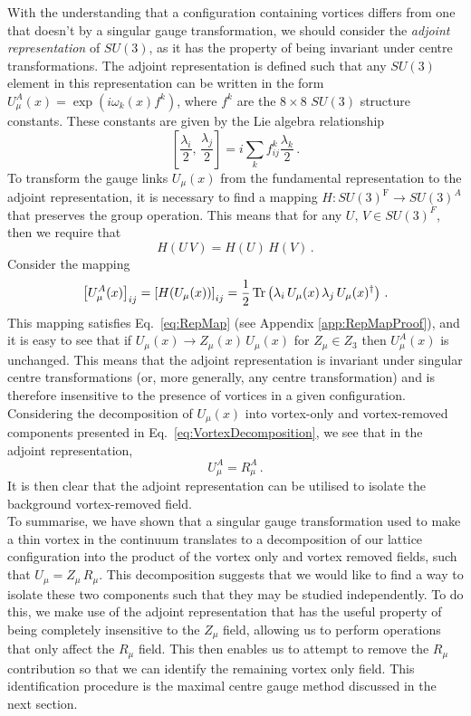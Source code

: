 With the understanding that a configuration containing vortices differs from one that doesn't by a singular gauge transformation, we should consider the \textit{adjoint representation} of $SU(3)$, as it has the property of being invariant under centre transformations. The adjoint representation is defined such that any $SU(3)$ element in this representation can be written in the form $U^A_\mu(x) = \exp\left(i \omega_k(x) f^k\right)$, where $f^k$ are the $8\times 8$ $SU(3)$ structure constants. These constants are given by the Lie algebra relationship
%
\begin{equation}
\left[\frac{\lambda_i}{2},\,\frac{\lambda_j}{2}\right] = i\sum_k f_{ij}^{k}\frac{\lambda_k}{2}\, .
\end{equation}
%
To transform the gauge links $U_\mu(x)$ from the fundamental representation to the adjoint representation, it is necessary to find a mapping $H:SU(3)^\text{F}\rightarrow SU(3)^A$ that preserves the group operation. This means that for any $U,\,V \in SU(3)^F$, then we require that
%
\begin{equation}
H(U\,V) = H(U)\,H(V)\, .
\label{eq:RepMap}
\end{equation}
%
Consider the mapping
%
\begin{equation}
\left[U_\mu^A(x)\right]_{ij} = \left[H(U_\mu(x))\right]_{ij} = \frac{1}{2}\operatorname{Tr}\left(\lambda_i \, U_\mu(x) \, \lambda_j\, U_\mu(x)^\dagger\right)\, .
\label{eq:AdjointRep}
\end{equation}
%
This mapping satisfies Eq.~\ref{eq:RepMap} (see Appendix \ref{app:RepMapProof}), and it is easy to see that if $U_\mu(x)\rightarrow Z_\mu(x)\, U_\mu(x)$ for $Z_\mu\in Z_3$ then $U^A_\mu(x)$ is unchanged. This means that the adjoint representation is invariant under singular centre transformations (or, more generally, any centre transformation) and is therefore insensitive to the presence of vortices in a given configuration. Considering the decomposition of $U_\mu(x)$ into vortex-only and vortex-removed components presented in Eq.~\ref{eq:VortexDecomposition}, we see that in the adjoint representation, 
%
\begin{equation}
U_\mu^A = R_\mu^A\, .
\end{equation}
%
It is then clear that the adjoint representation can be utilised to isolate the background vortex-removed field.\\

To summarise, we have shown that a singular gauge transformation used to make a thin vortex in the continuum translates to a decomposition of our lattice configuration into the product of the vortex only and vortex removed fields, such that $U_\mu = Z_\mu\,R_\mu$. This decomposition suggests that we would like to find a way to isolate these two components such that they may be studied independently. To do this, we make use of the adjoint representation that has the useful property of being completely insensitive to the $Z_\mu$ field, allowing us to perform operations that only affect the $R_\mu$ field. This then enables us to attempt to remove the $R_\mu$ contribution so that we can identify the remaining vortex only field. This identification procedure is the maximal centre gauge method discussed in the next section. 
 
